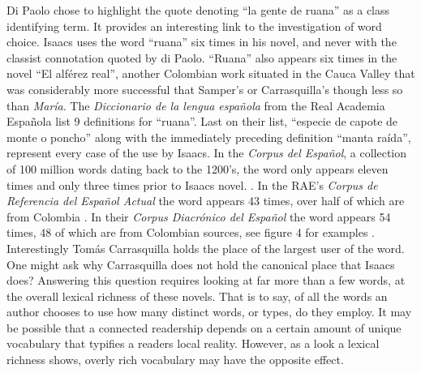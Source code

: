 \documentclass[12pt]{report}
\begin{document}
Di Paolo chose to highlight the quote denoting \enquote{la gente de ruana} as a class identifying term. It provides an interesting link to the investigation of word choice.
Isaacs uses the word \enquote{ruana} six times in his novel, and never with the classist connotation quoted by di Paolo.
\enquote{Ruana} also appears six times in the novel \enquote{El alférez real}, another Colombian work situated in the Cauca Valley that was considerably more successful that Samper's or Carrasquilla's though less so than \textit{María}.
The \textit{Diccionario de la lengua española} from the Real Academia Española list 9 definitions for \enquote{ruana}.
Last on their list, \enquote{especie de capote de monte o poncho} along with the immediately preceding definition \enquote{manta raída}, represent every case of the use by Isaacs.
In the \textit{Corpus del Español}, a collection of 100 million words dating back to the 1200's, the word only appears eleven times and only three times prior to Isaacs novel. \autocite{Davies2012}. 
In the RAE's \textit{Corpus de Referencia del Español Actual} the word appears 43 times, over half of which are from Colombia \autocite{Crea}.
In their \textit{Corpus Diacrónico del Español} the word appears 54 times, 48 of which are from Colombian sources, see figure 4 for examples \autocite{Corde}.
Interestingly Tomás Carrasquilla holds the place of the largest user of the word.
One might ask why Carrasquilla does not hold the canonical place that Isaacs does?
Answering this question requires looking at far more than a few words, at the overall lexical richness of these novels.
That is to say, of all the words an author chooses to use how many distinct words, or types, do they employ.
It may be possible that a connected readership depends on a certain amount of unique vocabulary that typifies a readers local reality.
However, as a look a lexical richness shows, overly rich vocabulary may have the opposite effect. 
\end{document}
